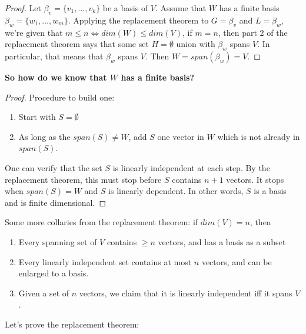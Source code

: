 \documentclass{article}
\newtheorem{one minute paper}[theorem]{One Minute Paper}
\begin{document}
\begin{proof}
    Let $\beta_v = \{v_1, \dots, v_k\}$ be a basis of $V$. Assume that $W$ has a finite basis $\beta_w = \{w_1, \dots, w_m\}$.
    Applying the replacement theorem to $G = \beta_v$ and $L = \beta_w$, we're given that $m \leq n \iff dim(W) \leq dim(V)$, if $m = n$, then part 2 of the replacement theorem says that 
    some set $H = \emptyset$ union with $\beta_w$ spans $V$. In particular, that means that $\beta_w$ spans $V$. Then $W = span(\beta_w) = V$. 
\end{proof}

\textbf{So how do we know that $W$ has a finite basis?}

\begin{proof}
    Procedure to build one:
    \begin{enumerate}
        \item Start with $S = \emptyset$
        \item As long as the $span(S) \neq W$, add $S$ one vector in $W$ which is not already in $span(S)$. 
    \end{enumerate}
    One can verify that the set $S$ is linearly independent at each step. By the replacement theorem, this must stop before $S$ contains $n+1$ vectors. It stops when $span(S) = W$ and $S$ is linearly dependent. In other words, $S$ is a basis and is finite dimensional. 
\end{proof}

Some more collaries from the replacement theorem: if $dim(V) = n$, then 
\begin{enumerate}
    \item Every spanning set of $V$ contains $\geq n$ vectors, and has a basis as a subset 
    \item Every linearly independent set contains at most $n$ vectors, and can be enlarged to a basis. 
    \item Given a set of $n$ vectors, we claim that it is linearly independent iff it spans $V$. 
\end{enumerate}


Let's prove the replacement theorem:
\end{document}

